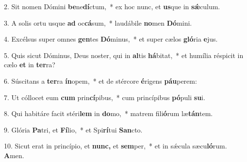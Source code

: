 \item 2. Sit nomen Dómini \textbf{be}ne\textbf{dí}ctum,~* ex hoc nunc, et \textbf{us}que in \textbf{sǽ}culum.
\item 3. A solis ortu usque \textbf{ad} oc\textbf{cá}sum,~* laudábile \textbf{no}men \textbf{Dó}mini.
\item 4. Excélsus super omnes \textbf{gen}tes \textbf{Dó}minus,~* et super cælos \textbf{gló}ria \textbf{e}jus.
\item 5. Quis sicut Dóminus, Deus noster, qui in \textbf{al}tis \textbf{há}bitat,~* et humília réspicit in cælo \textbf{et} in \textbf{ter}ra?
\item 6. Súscitans a \textbf{ter}ra \textbf{ín}opem,~* et de stércore \textbf{é}rigens \textbf{páu}perem:
\item 7. Ut cóllocet eum \textbf{cum} prin\textbf{cí}pibus,~* cum princípibus \textbf{pó}puli \textbf{su}i.
\item 8. Qui habitáre facit stéri\textbf{lem} in \textbf{do}mo,~* matrem fili\textbf{ó}rum læ\textbf{tán}tem.
\item 9. Glória \textbf{Pa}tri, et \textbf{Fí}lio,~* et Spi\textbf{rí}tui \textbf{San}cto.
\item 10. Sicut erat in princípio, et \textbf{nunc,} et \textbf{sem}per,~* et in sǽcula sæcu\textbf{ló}rum. \textbf{A}men.
